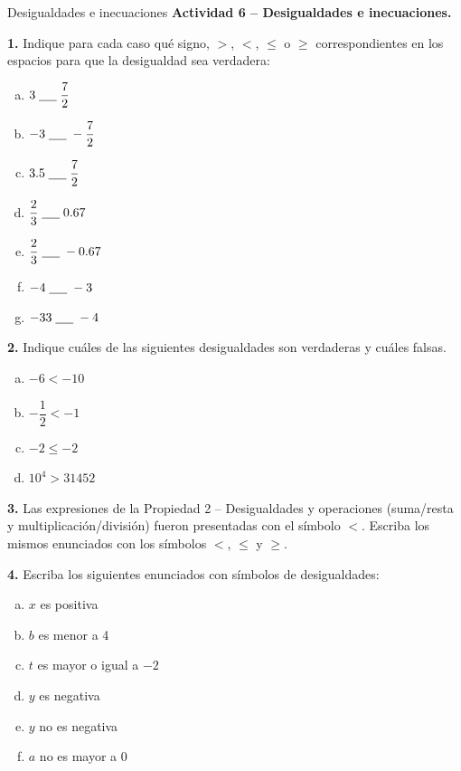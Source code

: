 \documentclass[9pt, aspectratio=169]{beamer}
\begin{document}
\begin{frame}{Desigualdades e inecuaciones}
    \textbf{Actividad 6 -- Desigualdades e inecuaciones.}
{\small

\textbf{1.} Indique para cada caso qué signo, $>$, $<$, $\leq$ o $\geq$ correspondientes en los espacios para que la desigualdad sea verdadera:
\begin{multicols}{4}
\begin{enumerate}[a)]
    \item $3 \; \underline{\hspace{0.5cm}} \; \dfrac{7}{2}$
    \item $-3 \; \underline{\hspace{0.5cm}} \; -\dfrac{7}{2}$
    \item $3.5 \; \underline{\hspace{0.5cm}} \; \dfrac{7}{2}$
    \item $\dfrac{2}{3} \; \underline{\hspace{0.5cm}} \; 0.67$
    \item $\dfrac{2}{3} \; \underline{\hspace{0.5cm}} \; -0.67$
    \item $-4 \; \underline{\hspace{0.5cm}} \; -3$
    \item $-33 \; \underline{\hspace{0.5cm}} \; -4$
\end{enumerate}
\end{multicols}

\textbf{2.} Indique cuáles de las siguientes desigualdades son verdaderas y cuáles falsas.
\begin{multicols}{4}
    \begin{enumerate}[a)]
        \item $-6 < -10$
        \item $-\dfrac{1}{2} < -1$
        \item $-2 \leq -2$
        \item $10^4 > 31452$
    \end{enumerate}
\end{multicols}

\textbf{3.} Las expresiones de la Propiedad 2 -- Desigualdades y operaciones (suma/resta y multiplicación/división) fueron presentadas con el símbolo $<$. Escriba los mismos enunciados con los símbolos $<$, $\leq$ y $\geq$.

\textbf{4.} Escriba los siguientes enunciados con símbolos de desigualdades:
\begin{multicols}{3}
    \begin{enumerate}[a)]
        \item $x$ es positiva
        \item $b$ es menor a 4
        \item $t$ es mayor o igual a $-2$
        \item $y$ es negativa
        \item $y$ no es negativa
        \item $a$ no es mayor a 0
    \end{enumerate}
\end{multicols}
}
\end{frame}
\end{document}
